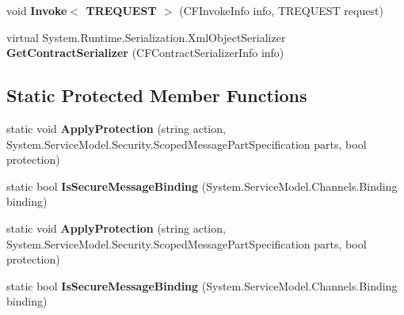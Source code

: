 \begin{DoxyCompactItemize}
\item 
\hypertarget{class_microsoft_1_1_tools_1_1_service_model_1_1_c_f_client_base_3_01_t_channel_01_4_a20c0ff7e581bbec6c0c10ae1cd2f37bb}{
void {\bfseries Invoke$<$ TREQUEST $>$} (CFInvokeInfo info, TREQUEST request)}
\label{class_microsoft_1_1_tools_1_1_service_model_1_1_c_f_client_base_3_01_t_channel_01_4_a20c0ff7e581bbec6c0c10ae1cd2f37bb}

\item 
\hypertarget{class_microsoft_1_1_tools_1_1_service_model_1_1_c_f_client_base_3_01_t_channel_01_4_a17e696bc478b5b0105e44acd988ecaf8}{
virtual System.Runtime.Serialization.XmlObjectSerializer {\bfseries GetContractSerializer} (CFContractSerializerInfo info)}
\label{class_microsoft_1_1_tools_1_1_service_model_1_1_c_f_client_base_3_01_t_channel_01_4_a17e696bc478b5b0105e44acd988ecaf8}

\end{DoxyCompactItemize}
\subsection*{Static Protected Member Functions}
\begin{DoxyCompactItemize}
\item 
\hypertarget{class_microsoft_1_1_tools_1_1_service_model_1_1_c_f_client_base_3_01_t_channel_01_4_a7f3b40328610c94ee4362b6ad60bf529}{
static void {\bfseries ApplyProtection} (string action, System.ServiceModel.Security.ScopedMessagePartSpecification parts, bool protection)}
\label{class_microsoft_1_1_tools_1_1_service_model_1_1_c_f_client_base_3_01_t_channel_01_4_a7f3b40328610c94ee4362b6ad60bf529}

\item 
\hypertarget{class_microsoft_1_1_tools_1_1_service_model_1_1_c_f_client_base_3_01_t_channel_01_4_af7405e7d1167413806058d69432fc807}{
static bool {\bfseries IsSecureMessageBinding} (System.ServiceModel.Channels.Binding binding)}
\label{class_microsoft_1_1_tools_1_1_service_model_1_1_c_f_client_base_3_01_t_channel_01_4_af7405e7d1167413806058d69432fc807}

\item 
\hypertarget{class_microsoft_1_1_tools_1_1_service_model_1_1_c_f_client_base_3_01_t_channel_01_4_a7f3b40328610c94ee4362b6ad60bf529}{
static void {\bfseries ApplyProtection} (string action, System.ServiceModel.Security.ScopedMessagePartSpecification parts, bool protection)}
\label{class_microsoft_1_1_tools_1_1_service_model_1_1_c_f_client_base_3_01_t_channel_01_4_a7f3b40328610c94ee4362b6ad60bf529}

\item 
\hypertarget{class_microsoft_1_1_tools_1_1_service_model_1_1_c_f_client_base_3_01_t_channel_01_4_af7405e7d1167413806058d69432fc807}{
static bool {\bfseries IsSecureMessageBinding} (System.ServiceModel.Channels.Binding binding)}
\label{class_microsoft_1_1_tools_1_1_service_model_1_1_c_f_client_base_3_01_t_channel_01_4_af7405e7d1167413806058d69432fc807}

\end{DoxyCompactItemize}
